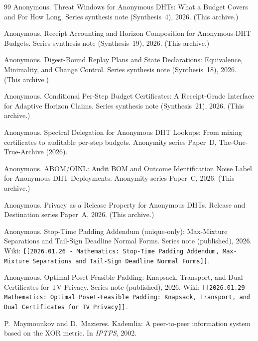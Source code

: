 \documentclass[11pt]{article}
\begin{document}
\begin{thebibliography}{99}
Anonymous.
\newblock Threat Windows for Anonymous {DHT}s: What a Budget Covers and For How Long.
\newblock Series synthesis note (Synthesis~4), 2026. (This archive.)

Anonymous.
\newblock Receipt Accounting and Horizon Composition for Anonymous-DHT Budgets.
\newblock Series synthesis note (Synthesis~19), 2026. (This archive.)

Anonymous.
\newblock Digest-Bound Replay Plans and State Declarations: Equivalence, Minimality, and Change Control.
\newblock Series synthesis note (Synthesis~18), 2026. (This archive.)

Anonymous.
\newblock Conditional Per-Step Budget Certificates: A Receipt-Grade Interface for Adaptive Horizon Claims.
\newblock Series synthesis note (Synthesis~21), 2026. (This archive.)

Anonymous.
\newblock Spectral Delegation for Anonymous DHT Lookups: From mixing certificates to auditable per-step budgets.
\newblock Anonymity series Paper~D, The-One-True-Archive (2026).

Anonymous.
\newblock ABOM/OINL: Audit BOM and Outcome Identification Noise Label for Anonymous DHT Deployments.
\newblock Anonymity series Paper~C, 2026. (This archive.)

Anonymous.
\newblock Privacy as a Release Property for Anonymous DHTs.
\newblock Release and Destination series Paper~A, 2026. (This archive.)

Anonymous.
\newblock Stop-Time Padding Addendum (unique-only): Max-Mixture Separations and Tail-Sign Deadline Normal Forms.
\newblock Series note (published), 2026.
\newblock Wiki: \texttt{[[2026.01.26 - Mathematics: Stop-Time Padding Addendum, Max-Mixture Separations and Tail-Sign Deadline Normal Forms]]}.

Anonymous.
\newblock Optimal Poset-Feasible Padding: Knapsack, Transport, and Dual Certificates for TV Privacy.
\newblock Series note (published), 2026.
\newblock Wiki: \texttt{[[2026.01.29 - Mathematics: Optimal Poset-Feasible Padding: Knapsack, Transport, and Dual Certificates for TV Privacy]]}.

P.~Maymounkov and D.~Mazieres.
\newblock Kademlia: A peer-to-peer information system based on the XOR metric.
\newblock In \emph{IPTPS}, 2002.


\end{thebibliography}
\end{document}
